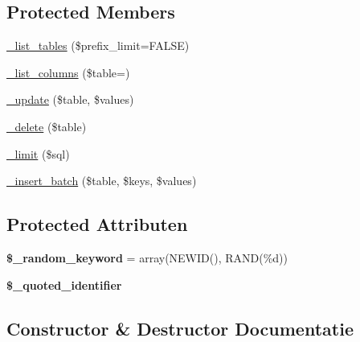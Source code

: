 \subsection*{Protected Members}
\begin{DoxyCompactItemize}
\item 
\mbox{\hyperlink{class_c_i___d_b__pdo__sqlsrv__driver_a435c0f3ce54fe7daa178baa8532ebd54}{\+\_\+list\+\_\+tables}} (\$prefix\+\_\+limit=F\+A\+L\+SE)
\item 
\mbox{\hyperlink{class_c_i___d_b__pdo__sqlsrv__driver_a7ccb7f9c301fe7f0a9db701254142b63}{\+\_\+list\+\_\+columns}} (\$table=\textquotesingle{}\textquotesingle{})
\item 
\mbox{\hyperlink{class_c_i___d_b__pdo__sqlsrv__driver_a2540b03a93fa73ae74c10d0e16fc073e}{\+\_\+update}} (\$table, \$values)
\item 
\mbox{\hyperlink{class_c_i___d_b__pdo__sqlsrv__driver_a133ea8446ded52589bd22cc9163d0896}{\+\_\+delete}} (\$table)
\item 
\mbox{\hyperlink{class_c_i___d_b__pdo__sqlsrv__driver_a3a02ea06541b8ecc25a33a61651562c8}{\+\_\+limit}} (\$sql)
\item 
\mbox{\hyperlink{class_c_i___d_b__pdo__sqlsrv__driver_a1978e1358c812587a46e242630365099}{\+\_\+insert\+\_\+batch}} (\$table, \$keys, \$values)
\end{DoxyCompactItemize}
\subsection*{Protected Attributen}
\begin{DoxyCompactItemize}
\item 
\mbox{\label{class_c_i___d_b__pdo__sqlsrv__driver_a10213aa6e05f6d924d3277bb1d2fea00}} 
{\bfseries \$\+\_\+random\+\_\+keyword} = array(\textquotesingle{}N\+E\+W\+ID()\textquotesingle{}, \textquotesingle{}R\+A\+ND(\%d)\textquotesingle{})
\item 
\mbox{\label{class_c_i___d_b__pdo__sqlsrv__driver_a1dae2f0e9ad7299438a9976d6cdbf2ad}} 
{\bfseries \$\+\_\+quoted\+\_\+identifier}
\end{DoxyCompactItemize}


\subsection{Constructor \& Destructor Documentatie}
\mbox{\label{class_c_i___d_b__pdo__sqlsrv__driver_a9162320adff1a1a4afd7f2372f753a3e}} 

